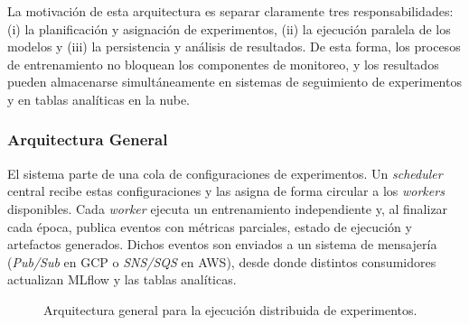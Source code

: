 \documentclass[conference]{IEEEtran}
\begin{document}
La motivación de esta arquitectura es separar claramente tres responsabilidades: (i) la planificación y asignación de experimentos, (ii) la ejecución paralela de los modelos y (iii) la persistencia y análisis de resultados. De esta forma, los procesos de entrenamiento no bloquean los componentes de monitoreo, y los resultados pueden almacenarse simultáneamente en sistemas de seguimiento de experimentos y en tablas analíticas en la nube.

\subsubsection{Arquitectura General}

El sistema parte de una cola de configuraciones de experimentos. Un \emph{scheduler} central recibe estas configuraciones y las asigna de forma circular a los \emph{workers} disponibles. Cada \emph{worker} ejecuta un entrenamiento independiente y, al finalizar cada época, publica eventos con métricas parciales, estado de ejecución y artefactos generados. Dichos eventos son enviados a un sistema de mensajería (\emph{Pub/Sub} en GCP o \emph{SNS/SQS} en AWS), desde donde distintos consumidores actualizan MLflow y las tablas analíticas.

\begin{figure}[!t]
\centering
{}
\caption{Arquitectura general para la ejecución distribuida de experimentos.}
\label{fig:infra_general}
\end{figure}
\end{document}
